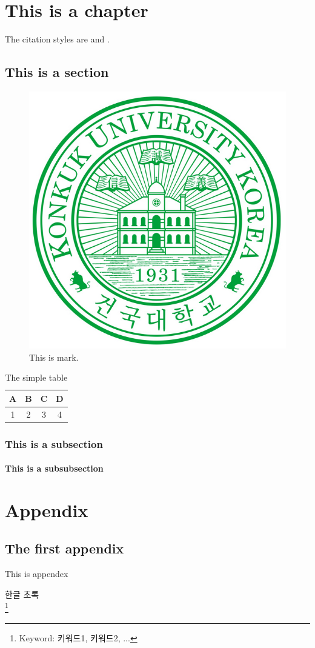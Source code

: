 \documentclass[11pt]{report}
\begin{document}
\chapter{This is a chapter}
The citation styles are \cite{Weinberg:1967tq} and \cite{Glashow:1961tr,Salam:1964ry,Glashow:1970gm}.

\section{This is a section}

\begin{figure}[h] \centering
\begin{center}
\includegraphics[width=.1\textwidth]{UI_Mark.jpg}
\caption{This is mark.}
\end{center}
\end{figure}


\lipsum[1]

\begin{table}[h]
\begin{center}
\begin{tabular}{|c|c|c|c|}
  \hline
  A & B & C & D\\
  \hline
  1 & 2 & 3 & 4\\
  \hline
\end{tabular}
\end{center}
\caption{The simple table}
\end{table}

\subsection{This is a subsection}
\lipsum[1]
\subsubsection{This is a subsubsection}
\lipsum[1]


% 
%

\printbibliography[title={\normalfont\fontsize{16}{16}\bfseries References}]

\cleardoublepage
{}  
% 
%

\chapter*{Appendix}
\setcounter{section}{0}
\renewcommand\thesection{\Alph{section}}
\section{The first appendix }

This is appendex


% 
%
\begin{KUabstractKO}
한글 초록 \\
\lipsum[1-2]\footnote{Keyword: 키워드1, 키워드2, ...}
\end{KUabstractKO}
\end{document}
